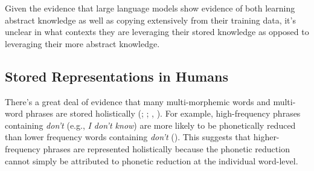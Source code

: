 \documentclass[
  12pt,
  letterpaper,
]{scrreprt}
\begin{document}
Given the evidence that large language models show evidence of both
learning abstract knowledge as well as copying extensively from their
training data, it's unclear in what contexts they are leveraging their
stored knowledge as opposed to leveraging their more abstract knowledge.

\subsection{Stored Representations in
Humans}\label{stored-representations-in-humans}

There's a great deal of evidence that many multi-morphemic words and
multi-word phrases are stored holistically
(;
;
,
). For example,
high-frequency phrases containing \emph{don't} (e.g., \emph{I don't
know}) are more likely to be phonetically reduced than lower frequency
words containing \emph{don't}
().
This suggests that higher-frequency phrases are represented holistically
because the phonetic reduction cannot simply be attributed to phonetic
reduction at the individual word-level.
\end{document}
